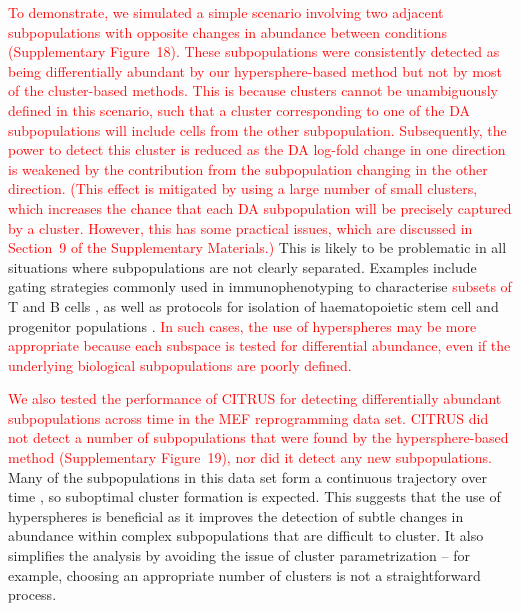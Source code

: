 \documentclass{article}
\newcommand\revised[1]{\textcolor{red}{#1}}
\newcommand{\suppoverclust}{9}
\newcommand{\suppfigclustersim}{18}
\newcommand{\suppfigclusterreal}{19}
\begin{document}
\revised{To demonstrate, we simulated a simple scenario involving two adjacent subpopulations with opposite changes in abundance between conditions (Supplementary Figure~\suppfigclustersim{}).
These subpopulations were consistently detected as being differentially abundant by our hypersphere-based method but not by most of the cluster-based methods.
This is because clusters cannot be unambiguously defined in this scenario, such that a cluster corresponding to one of the DA subpopulations will include cells from the other subpopulation.
Subsequently, the power to detect this cluster is reduced as the DA log-fold change in one direction is weakened by the contribution from the subpopulation changing in the other direction.
(This effect is mitigated by using a large number of small clusters, which increases the chance that each DA subpopulation will be precisely captured by a cluster.
However, this has some practical issues, which are discussed in Section~\suppoverclust{} of the Supplementary Materials.)}
This is likely to be problematic in all situations where subpopulations are not clearly separated.
Examples include gating strategies commonly used in immunophenotyping to characterise \revised{subsets of} T and B cells \cite{finak2016standardizing}, as well as protocols for isolation of haematopoietic stem cell and progenitor populations \cite{wilson2015combined}.
\revised{In such cases, the use of hyperspheres may be more appropriate because each subspace is tested for differential abundance, even if the underlying biological subpopulations are poorly defined.}

\revised{We also tested the performance of CITRUS for detecting differentially abundant subpopulations across time in the MEF reprogramming data set.
CITRUS did not detect a number of subpopulations that were found by the hypersphere-based method (Supplementary Figure~\suppfigclusterreal{}), nor did it detect any new subpopulations.}
Many of the subpopulations in this data set form a continuous trajectory over time \cite{zunder2015continuous}, so suboptimal cluster formation is expected.
This suggests that the use of hyperspheres is beneficial as it improves the detection of subtle changes in abundance within complex subpopulations that are difficult to cluster.
It also simplifies the analysis by avoiding the issue of cluster parametrization -- for example, choosing an appropriate number of clusters is not a straightforward process.

\end{document}
